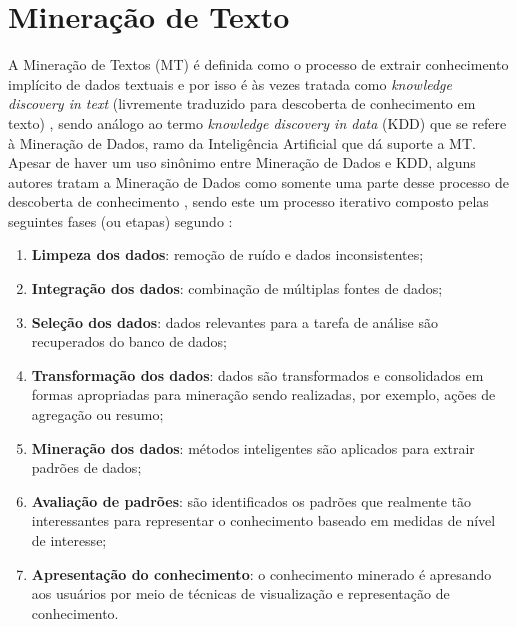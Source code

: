 \section{Mineração de Texto} \label{sec:MineraçãoTexto}
    A Mineração de Textos (MT) é definida como o processo de extrair conhecimento implícito de dados textuais \cite{Jo2018TMCIBDC,Feldman:2006:TMH:1076381} e por isso é às vezes tratada como \textit{knowledge discovery in text} (livremente traduzido para descoberta de conhecimento em texto) \cite{Kodratoff:1999:KDT:646358.689959, Feldman:1995:KDT:3001335.3001354}, sendo análogo ao termo \textit{knowledge discovery in data} (KDD) que se refere à Mineração de Dados, ramo da Inteligência Artificial que dá suporte a MT. 
    Apesar de haver um uso sinônimo entre Mineração de Dados e KDD, alguns autores tratam a Mineração de Dados como somente uma parte desse processo de descoberta de conhecimento \cite[p.~6]{Han:2011:DMC:1972541}, sendo este um processo iterativo composto pelas seguintes fases (ou etapas) segundo :
    \begin{enumerate}
        \item \textbf{Limpeza dos dados}: remoção de ruído e dados inconsistentes;
        \item \textbf{Integração dos dados}: combinação de múltiplas fontes de dados;
        \item \textbf{Seleção dos dados}: dados relevantes para a tarefa de análise são recuperados do banco de dados;
        \item \textbf{Transformação dos dados}: dados são transformados e consolidados em formas apropriadas para mineração sendo realizadas, por exemplo, ações de agregação ou resumo;
        \item \textbf{Mineração dos dados}: métodos inteligentes são aplicados para extrair padrões de dados;
        \item \textbf{Avaliação de padrões}: são identificados os padrões que realmente tão interessantes para representar o conhecimento baseado em medidas de nível de interesse;
        \item \textbf{Apresentação do conhecimento}: o conhecimento minerado é apresando aos usuários por meio de técnicas de visualização e representação de conhecimento.
    \end{enumerate}
